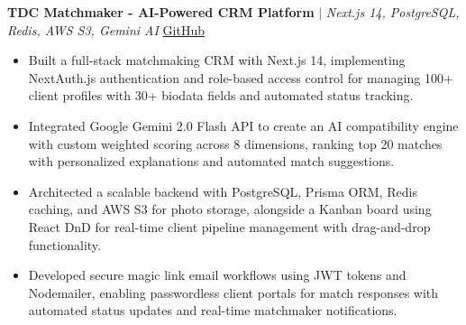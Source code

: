 \textbf{TDC Matchmaker - AI-Powered CRM Platform} $|$ \textit{Next.js 14, PostgreSQL, Redis, AWS S3, Gemini AI} \hfill \href{https://github.com/Sarvang18/Matchmaker}{GitHub}
\vspace{-4pt}
\begin{itemize}[leftmargin=0.15in, itemsep=-2pt]\small
\item Built a full-stack matchmaking CRM with Next.js 14, implementing NextAuth.js authentication and role-based access control for managing 100+ client profiles with 30+ biodata fields and automated status tracking.
\item Integrated Google Gemini 2.0 Flash API to create an AI compatibility engine with custom weighted scoring across 8 dimensions, ranking top 20 matches with personalized explanations and automated match suggestions.
\item Architected a scalable backend with PostgreSQL, Prisma ORM, Redis caching, and AWS S3 for photo storage, alongside a Kanban board using React DnD for real-time client pipeline management with drag-and-drop functionality.
\item Developed secure magic link email workflows using JWT tokens and Nodemailer, enabling passwordless client portals for match responses with automated status updates and real-time matchmaker notifications.
\end{itemize}



%

